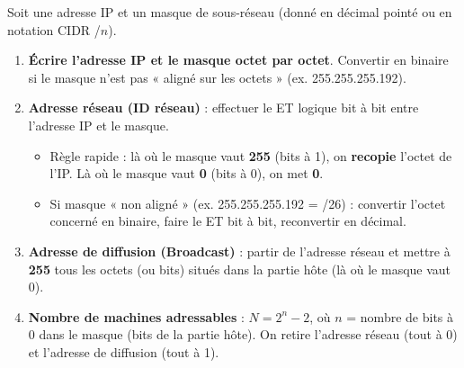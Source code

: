 \documentclass[11pt]{article}
\newcommand{\cle}[1]{{\popxbold\color{popdark}#1}}
\begin{document}
\begin{methode}
Soit une adresse IP et un masque de sous-réseau (donné en décimal pointé ou en notation CIDR /$n$).
\begin{enumerate}
\item \textbf{Écrire l'adresse IP et le masque octet par octet}. Convertir en binaire si le masque n'est pas « aligné sur les octets » (ex. 255.255.255.192).
\item \textbf{Adresse réseau (ID réseau)} : effectuer le \cle{ET logique} bit à bit entre l'adresse IP et le masque.
  \begin{itemize}
  \item Règle rapide : là où le masque vaut \textbf{255} (bits à 1), on \textbf{recopie} l'octet de l'IP. Là où le masque vaut \textbf{0} (bits à 0), on met \textbf{0}.
  \item Si masque « non aligné » (ex. 255.255.255.192 = /26) : convertir l'octet concerné en binaire, faire le ET bit à bit, reconvertir en décimal.
  \end{itemize}
\item \textbf{Adresse de diffusion (Broadcast)} : partir de l'adresse réseau et mettre à \textbf{255} tous les octets (ou bits) situés dans la partie hôte (là où le masque vaut 0).
\item \textbf{Nombre de machines adressables} : $N = 2^{n} - 2$, où $n$ = nombre de bits à 0 dans le masque (bits de la partie hôte). On retire l'adresse réseau (tout à 0) et l'adresse de diffusion (tout à 1).
\end{enumerate}
\end{methode}
\end{document}
